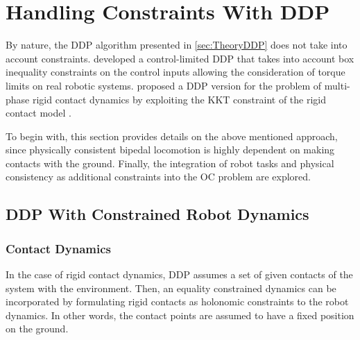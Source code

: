 %
%
%


\section{Handling Constraints With DDP}\label{sec:TheoryConstrainedDDP}
By nature, the \gls{DDP} algorithm presented in \cref{sec:TheoryDDP} does not take into account constraints. \citeauthor{tassa2014control} developed a control-limited \gls{DDP} \cite{tassa2014control} that takes into account box inequality constraints on the control inputs allowing the consideration of torque limits on real robotic systems. \citeauthor{budhiraja2018differential} proposed a \gls{DDP} version for the problem of multi-phase rigid contact dynamics by exploiting the \gls{KKT} constraint of the rigid contact model \cite{budhiraja2018differential}. 

To begin with, this section provides details on the above mentioned approach, since physically consistent bipedal locomotion is highly dependent on making contacts with the ground. Finally, the integration of robot tasks and physical consistency as additional constraints into the \gls{OC} problem are explored. 

\subsection{DDP With Constrained Robot Dynamics}\label{subsec:DDPConstrainedRobotDynamics}
\subsubsection{Contact Dynamics}
In the case of rigid contact dynamics, \gls{DDP} assumes a set of given contacts of the system with the environment. Then, an equality constrained dynamics can be incorporated by formulating rigid contacts as holonomic constraints to the robot dynamics. In other words, the contact points are assumed to have a fixed position on the ground. 

